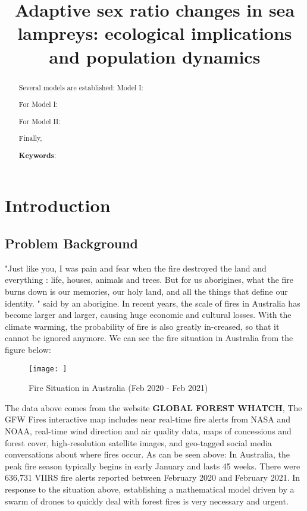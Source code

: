 \documentclass[12pt]{article}  %
\title{Adaptive sex ratio changes in sea lampreys: ecological implications and population dynamics}  %
\newcommand{\upcite}[1]{\textsuperscript{\textsuperscript{\cite{#1}}}}
\begin{document}
 
 \begin{abstract}
     
 Several models are established: Model I: 
 
 For Model I:
 
 For Model II:
 
 Finally, 
 
 
     \vspace{5pt}  %
     \textbf{Keywords}: 
 
 \end{abstract}
 
 \maketitle  %
 
 \tableofcontents  %
 
 
 \section{Introduction}
 
 \subsection{Problem Background}
 "Just like you, I was pain and fear when the fire destroyed the land and everything : life, houses, animals and trees. But for us aborigines, what the fire burns down is our memories, our holy land, and all the things that define our identity. " said by an aborigine. In recent years, the scale of fires in Australia has become larger and larger, causing huge economic and cultural losses. With the climate warming, the probability of fire is also greatly in-creased, so that it cannot be ignored anymore. We can see the fire situation in Australia from the figure below:
 
 \begin{figure}[htbp]  %
 \centering  %
 \texttt{[image: ]} %
 \caption{Fire Situation in Australia (Feb 2020 - Feb 2021)} %
 \label{fig:Fire Situation} %
 \end{figure}
 
 The data above comes from the website \textbf{GLOBAL FOREST WHATCH}\upcite{1}, The GFW Fires interactive map includes near real-time fire alerts from NASA and NOAA, real-time wind direction and air quality data, maps of concessions and forest cover, high-resolution satellite images, and geo-tagged social media conversations about where fires occur. 
 As can be seen above: In Australia, the peak fire season typically begins in early January and lasts 45 weeks. There were 636,731 VIIRS fire alerts reported between February 2020 and February 2021. In response to the situation above, establishing a mathematical model driven by a swarm of drones to quickly deal with forest fires is very necessary and urgent.
 
\end{document}
